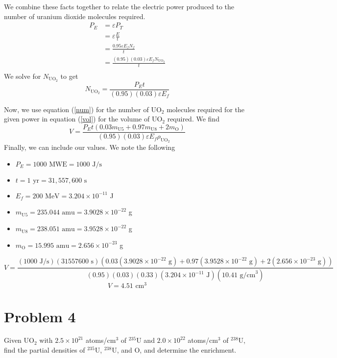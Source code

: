 \documentclass{report}
\begin{document}
We combine these facts together to relate the electric power produced to the number of uranium dioxide molecules required.
\begin{align*} 
P_E	&= \varepsilon P_T \\
	&= \varepsilon \frac{E}{t} \\
	&= \frac{0.95\varepsilon E_f N_f}{t} \\
	&= \frac{(0.95)(0.03)\varepsilon E_f N_{\text{UO}_2}}{t} \\
\end{align*}
We solve for $N_{\text{UO}_2}$ to get
\begin{equation}
\label{num}
N_{\text{UO}_2} = \frac{P_E t}{(0.95)(0.03)\varepsilon E_f}
\end{equation}

Now, we use equation (\ref{num}) for the number of UO$_2$ molecules required for the given power in equation (\ref{vol}) for the volume of UO$_2$ required. We find
$$ V = \frac{P_E t(0.03m_{\text{U5}} + 0.97m_{\text{U8}} + 2 m_{\text{O}})}{(0.95)(0.03)\varepsilon E_f\rho_{\text{UO}_2}} $$
Finally, we can include our values. We note the following
\begin{itemize}
\item $P_E = 1000\text{ MWE} = 1000\text{ J/s}$
\item $t = 1\text{ yr} = 31,557,600\text{ s}$
\item $E_f = 200\text{ MeV} = 3.204 \times 10^{-11}$ J
\item $m_{\text{U5}} = 235.044\text{ amu} = 3.9028 \times 10^{-22}$ g
\item $m_{\text{U8}} = 238.051\text{ amu} = 3.9528 \times 10^{-22}$ g
\item $m_{\text{O}} = 15.995\text{ amu} = 2.656 \times 10^{-23}$ g
\end{itemize}
$$ V = \frac{(1000\text{ J/s})(31557600\text{ s})(0.03(3.9028 \times 10^{-22}\text{ g}) + 0.97(3.9528 \times 10^{-22}\text{ g}) + 2(2.656 \times 10^{-23}\text{ g}))}{(0.95)(0.03)(0.33)(3.204 \times 10^{-11}\text{ J})(10.41\text{ g/cm}^3)} $$
$$\boxed{ V = 4.51\text{ cm}^3 }$$



\newpage
\section*{Problem 4}

Given UO$_2$ with $2.5 \times 10^{21}$ atoms/cm$^3$ of $^{235}$U and $2.0\times10^{22}$ atoms/cm$^3$ of $^{238}$U, find the partial densities of $^{235}$U, $^{238}$U, and O, and determine the enrichment.
\end{document}
